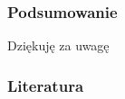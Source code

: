\documentclass{beamer}
\begin{document}
\begin{frame}
\frametitle{Podsumowanie}

\end{frame}

\begin{frame}
\begin{center}
Dziękuję za uwagę
\end{center}
\end{frame}



\begin{frame}[allowframebreaks]
\frametitle{Literatura}
\nocite{*}
\printbibliography
\end{frame}
\end{document}
